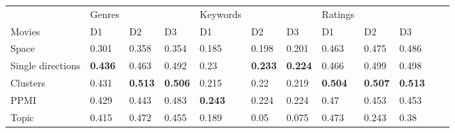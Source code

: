 \begin{landscape}
	\begin{table}[]
		\begin{tabular}{llll@{\hskip 0.25in}lll@{\hskip 0.25in}lllll}
			& Genres                          &              &               & Keywords                        &                 &                       & Ratings                         &                      &                     &  & \\
			Movies            & D1                              & D2                              & D3                              & D1                              & D2                              & D3                              & D1                              & D2                              & D3                              &             &             \\
			\toprule[\heavyrulewidth]
			Space             & 0.301                           & 0.358                           & 0.354                           & 0.185                           & 0.198                           & 0.201                           & 0.463                           & 0.475                           & 0.486                           &             &             \\
			Single directions & \textbf{0.436} & 0.463                           & 0.492                           & 0.23                            & \textbf{0.233} & \textbf{0.224} & 0.466                           & 0.499                           & 0.498                           &             &             \\
			Clusters          & 0.431                           & \textbf{0.513} & \textbf{0.506} & 0.215                           & 0.22                            & 0.219                           & \textbf{0.504} & \textbf{0.507} & \textbf{0.513} &             &             \\
			PPMI              & 0.429                           & 0.443                           & 0.483                           & \textbf{0.243} & 0.224                           & 0.224                           & 0.47                            & 0.453                           & 0.453                           &             &             \\
			Topic             & 0.415                           & 0.472                           & 0.455                           & 0.189                           & 0.05                            & 0.075                           & 0.473                           & 0.243                           & 0.38                            &             &             \\

\end{tabular}
\end{table}
\end{landscape}
